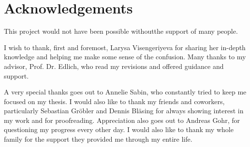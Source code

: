 \section*{Acknowledgements}
This project would not have been possible withoutthe support of many people.

I wish to thank, first and foremost, Larysa Visengeriyeva for sharing her in-depth knowledge and helping me make some sense of the confusion. Many thanks to my advisor, Prof. Dr. Edlich, who read my revisions and offered guidance and support.

A very special thanks goes out to Annelie Sabin, who constantly tried to keep me focused on my thesis. I would also like to thank my friends and coworkers, particularly Sebastian Gröbler and Dennis Bläsing for always showing interest in my work and for proofreading. Appreciation also goes out to Andreas Gohr, for questioning my progress every other day. I would also like to thank my whole family for the support they provided me through my entire life.